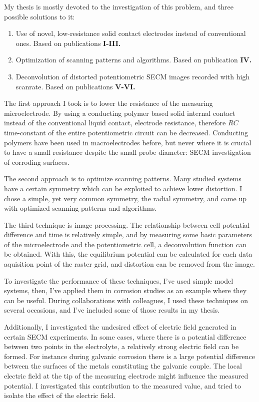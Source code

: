 My thesis is mostly devoted to the investigation of this problem, and three possible solutions to it:

\begin{enumerate}
\item Use of novel, low-resistance solid contact electrodes instead of conventional ones.
Based on publications \textbf{\color{blue}I-III.}
\item Optimization of scanning patterns and algorithms.
Based on publication \textbf{\color{blue}IV.}
\item Deconvolution of distorted potentiometric SECM images recorded with high scanrate.
Based on publications \textbf{\color{blue}V-VI.}
\end{enumerate}

The first approach I took is to lower the resistance of the measuring microelectrode.
By using a conducting polymer based solid internal contact instead of the conventional liquid contact, electrode resistance, therefore $RC$ time-constant of the entire potentiometric circuit can be decreased.
Conducting polymers have been used in macroelectrodes before, but never where it is crucial to have a small resistance despite the small probe diameter: SECM investigation of corroding surfaces.

The second approach is to optimize scanning patterns.
Many studied systems have a certain symmetry which can be exploited to achieve lower distortion.
I chose a simple, yet very common symmetry, the radial symmetry, and came up with optimized scanning patterns and algorithms.

The third technique is image processing.
The relationship between cell potential difference and time is relatively simple, and by measuring some basic parameters of the microelectrode and the potentiometric cell, a deconvolution function can be obtained.
With this, the equilibrium potential can be calculated for each data aquisition point of the raster grid, and distortion can be removed from the image.

To investigate the performance of these techniques, I've used simple model systems, then, I've applied them in corrosion studies as an example where they can be useful.
During collaborations with colleagues, I used these techniques on several occasions, and I've included some of those results in my thesis.

Additionally, I investigated the undesired effect of electric field generated in certain SECM experiments.
In some cases, where there is a potential difference between two points in the electrolyte, a relatively strong electric field can be formed.
For instance during galvanic corrosion there is a large potential difference between the surfaces of the metals constituting the galvanic couple.
The local electric field at the tip of the measuring electrode might influence the measured potential.
I investigated this contribution to the measured value, and tried to isolate the effect of the electric field.
